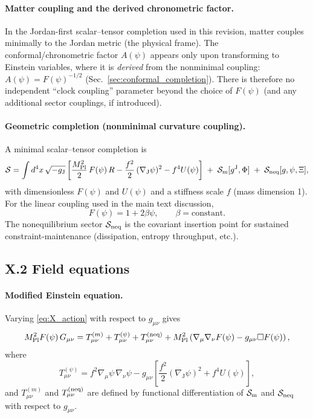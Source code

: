 \documentclass[10pt]{article}
\newcommand{\gJ}{g^{\mathrm{J}}}        %
\newcommand{\Fpsi}{F(\psi)}
\newcommand{\Apsi}{A(\psi)}
\begin{document}
\paragraph{Matter coupling and the derived chronometric factor.}
In the Jordan-first scalar--tensor completion used in this revision, matter couples minimally to the
Jordan metric (the physical frame). The conformal/chronometric factor \(A(\psi)\) appears only upon
transforming to Einstein variables, where it is \emph{derived} from the nonminimal coupling:
\(\Apsi=\Fpsi^{-1/2}\) (Sec.~\ref{sec:conformal_completion}). There is therefore no independent
``clock coupling'' parameter beyond the choice of \(F(\psi)\) (and any additional sector couplings,
if introduced).

\paragraph{Geometric completion (nonminimal curvature coupling).}
A minimal scalar--tensor completion is
\begin{equation}
\mathcal{S}
=
\int d^4x\,\sqrt{-g_{\mathrm{J}}}\left[
\frac{M_{\rm Pl}^{2}}{2}\,F(\psi)\,R
-\frac{f^{2}}{2}\,(\nabla_{\mathrm{J}}\psi)^2
-f^{4}U(\psi)
\right]
\;+\;
\mathcal{S}_{\rm m}[\gJ,\Phi]
\;+\;
\mathcal{S}_{\rm neq}[g,\psi,\Xi],
\label{eq:X_action}
\end{equation}
with dimensionless $F(\psi)$ and $U(\psi)$ and a stiffness scale $f$ (mass dimension 1).
For the linear coupling used in the main text discussion,
\begin{equation}
F(\psi)=1+2\beta\psi,
\qquad \beta=\text{constant}.
\label{eq:X_F_linear}
\end{equation}
The nonequilibrium sector $\mathcal{S}_{\rm neq}$ is the covariant insertion point for sustained
constraint-maintenance (dissipation, entropy throughput, etc.).

\subsection{X.2 Field equations}

\paragraph{Modified Einstein equation.}
Varying \eqref{eq:X_action} with respect to $g_{\mu\nu}$ gives
\begin{equation}
M_{\rm Pl}^{2}F(\psi)\,G_{\mu\nu}
=
T^{(m)}_{\mu\nu}
+
T^{(\psi)}_{\mu\nu}
+
T^{(\rm neq)}_{\mu\nu}
+
M_{\rm Pl}^{2}\left(\nabla_\mu\nabla_\nu F(\psi)-g_{\mu\nu}\Box F(\psi)\right),
\label{eq:X_einstein}
\end{equation}
where
\begin{equation}
T^{(\psi)}_{\mu\nu}
=
f^{2}\nabla_\mu\psi\,\nabla_\nu\psi
-
g_{\mu\nu}\left[\frac{f^{2}}{2}(\nabla_{\mathrm{J}}\psi)^2+f^{4}U(\psi)\right],
\label{eq:X_Tpsi}
\end{equation}
and $T^{(m)}_{\mu\nu}$ and $T^{(\rm neq)}_{\mu\nu}$ are defined by functional differentiation of
$\mathcal{S}_{\rm m}$ and $\mathcal{S}_{\rm neq}$ with respect to $g_{\mu\nu}$.
\end{document}
